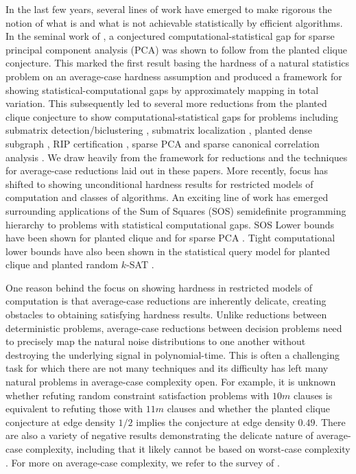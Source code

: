\documentclass[11pt]{article}
\begin{document}
In the last few years, several lines of work have emerged to make rigorous the notion of what is and what is not achievable statistically by efficient algorithms. In the seminal work of \cite{berthet2013complexity}, a conjectured computational-statistical gap for sparse principal component analysis (PCA) was shown to follow from the planted clique conjecture. This marked the first result basing the hardness of a natural statistics problem on an average-case hardness assumption and produced a framework for showing statistical-computational gaps by approximately mapping in total variation. This subsequently led to several more reductions from the planted clique conjecture to show computational-statistical gaps for problems including submatrix detection/biclustering \cite{ma2015computational}, submatrix localization \cite{cai2015computational}, planted dense subgraph \cite{hajek2015computational}, RIP certification \cite{wang2016average}, sparse PCA and sparse canonical correlation analysis \cite{wang2016statistical, gao2017sparse}. We draw heavily from the framework for reductions and the techniques for average-case reductions laid out in these papers. More recently, focus has shifted to showing unconditional hardness results for restricted models of computation and classes of algorithms. An exciting line of work has emerged surrounding applications of the Sum of Squares (SOS) semidefinite programming hierarchy to problems with statistical computational gaps. SOS Lower bounds have been shown for planted clique \cite{barak2016nearly} and for sparse PCA \cite{krauthgamer2015semidefinite, ma2015sum, hopkins2017power}. Tight computational lower bounds have also been shown in the statistical query model for planted clique and planted random $k$-SAT \cite{feldman2012statistical, feldman2015complexity}.

One reason behind the focus on showing hardness in restricted models of computation is that average-case reductions are inherently delicate, creating obstacles to obtaining satisfying hardness results. Unlike reductions between deterministic problems, average-case reductions between decision problems need to precisely map the natural noise distributions to one another without destroying the underlying signal in polynomial-time. This is often a challenging task for which there are not many techniques and its difficulty has left many natural problems in average-case complexity open. For example, it is unknown whether refuting random constraint satisfaction problems with $10m$ clauses is equivalent to refuting those with $11m$ clauses and whether the planted clique conjecture at edge density $1/2$ implies the conjecture at edge density $0.49$. There are also a variety of negative results demonstrating the delicate nature of average-case complexity, including that it likely cannot be based on worst-case complexity \cite{bogdanov2006worst}. For more on average-case complexity, we refer to the survey of \cite{bogdanov2006average}.
\end{document}
